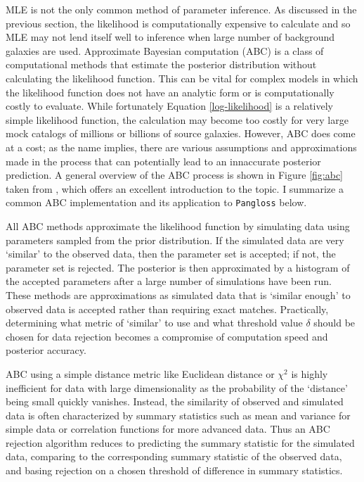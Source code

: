 \documentclass[%
 reprint,
 amsmath,amssymb,
 aps,nofootinbib
]{revtex4-1}
\begin{document}
MLE is not the only common method of parameter inference. As discussed in the previous section, the likelihood is computationally expensive to calculate and so MLE may not lend itself well to inference when large number of background galaxies are used. Approximate Bayesian computation (ABC) is a class of computational methods that estimate the posterior distribution without calculating the likelihood function. This can be vital for complex models in which the likelihood function does not have an analytic form or is computationally costly to evaluate. While fortunately Equation \eqref{log-likelihood} is a relatively simple likelihood function, the calculation may become too costly for very large mock catalogs of millions or billions of source galaxies. However, ABC does come at a cost; as the name implies, there are various assumptions and approximations made in the process that can potentially lead to an innaccurate posterior prediction. A general overview of the ABC process is shown in Figure \ref{fig:abc} taken from \cite{abc}, which offers an excellent introduction to the topic. I summarize a common ABC implementation and its application to \texttt{Pangloss} below.


All ABC methods approximate the likelihood function by simulating data using parameters sampled from the prior distribution. If the simulated data are very `similar' to the observed data, then the parameter set is accepted; if not, the parameter set is rejected. The posterior is then approximated by a histogram of the accepted parameters after a large number of simulations have been run. These methods are approximations as simulated data that is `similar enough' to observed data is accepted rather than requiring exact matches. Practically, determining what metric of `similar' to use and what threshold value $\delta$ should be chosen for data rejection becomes a compromise of computation speed and posterior accuracy.

ABC using a simple distance metric like Euclidean distance or $\chi^2$ is highly inefficient for data with large dimensionality as the probability of the `distance' being small quickly vanishes. Instead, the similarity of observed and simulated data is often characterized by summary statistics such as mean and variance for simple data or correlation functions for more advanced data. Thus an ABC rejection algorithm reduces to predicting the summary statistic for the simulated data, comparing to the corresponding summary statistic of the observed data, and basing rejection on a chosen threshold of difference in summary statistics.
\end{document}
